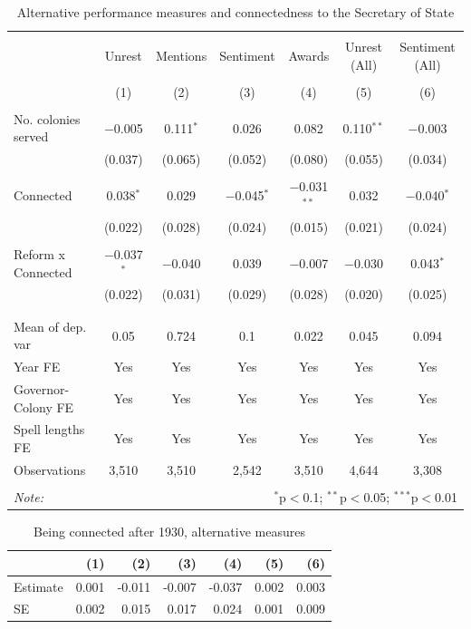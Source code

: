 \documentclass[a4paper]{article}\usepackage[]{graphicx}\usepackage[]{xcolor}
\begin{document}
\begin{table}[!htbp] \centering 
  \caption{Alternative performance measures and connectedness to the Secretary of State} 
  \label{tab:alt} 
\scriptsize 
\begin{tabular}{@{\extracolsep{5pt}}lcccccc} 
\\[-1.8ex]\hline 
\hline \\[-1.8ex] 
 & Unrest & Mentions & Sentiment & Awards & Unrest (All) & Sentiment (All) \\ 
\\[-1.8ex] & (1) & (2) & (3) & (4) & (5) & (6)\\ 
\hline \\[-1.8ex] 
 No. colonies served & $-$0.005 & 0.111$^{*}$ & 0.026 & 0.082 & 0.110$^{**}$ & $-$0.003 \\ 
  & (0.037) & (0.065) & (0.052) & (0.080) & (0.055) & (0.034) \\ 
  & & & & & & \\ 
 Connected & 0.038$^{*}$ & 0.029 & $-$0.045$^{*}$ & $-$0.031$^{**}$ & 0.032 & $-$0.040$^{*}$ \\ 
  & (0.022) & (0.028) & (0.024) & (0.015) & (0.021) & (0.024) \\ 
  & & & & & & \\ 
 Reform x Connected & $-$0.037$^{*}$ & $-$0.040 & 0.039 & $-$0.007 & $-$0.030 & 0.043$^{*}$ \\ 
  & (0.022) & (0.031) & (0.029) & (0.028) & (0.020) & (0.025) \\ 
  & & & & & & \\ 
\hline \\[-1.8ex] 
Mean of dep. var & 0.05 & 0.724 & 0.1 & 0.022 & 0.045 & 0.094 \\ 
Year FE & Yes & Yes & Yes & Yes & Yes & Yes \\ 
Governor-Colony FE & Yes & Yes & Yes & Yes & Yes & Yes \\ 
Spell lengths FE & Yes & Yes & Yes & Yes & Yes & Yes \\ 
Observations & 3,510 & 3,510 & 2,542 & 3,510 & 4,644 & 3,308 \\ 
\hline 
\hline \\[-1.8ex] 
\textit{Note:}  & \multicolumn{6}{r}{$^{*}$p$<$0.1; $^{**}$p$<$0.05; $^{***}$p$<$0.01} \\ 
\end{tabular} 
\end{table} 
\begin{table}[!h]
\centering\centering\centering
\caption{\label{tab:combo_alt}Being connected after 1930, alternative measures}
\centering
\fontsize{7}{9}\selectfont
\begin{tabular}[t]{lrrrrrr}
\toprule
  & (1) & (2) & (3) & (4) & (5) & (6)\\
\midrule
Estimate & 0.001 & -0.011 & -0.007 & -0.037 & 0.002 & 0.003\\
SE & 0.002 & 0.015 & 0.017 & 0.024 & 0.001 & 0.009\\
\bottomrule
\end{tabular}
\end{table}
\end{document}
